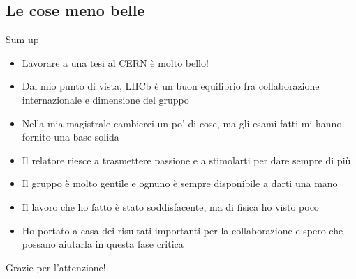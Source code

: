 \documentclass[
10pt,
aspectratio=169,
]{beamer}
\begin{document}
\subsection{Le cose meno belle}


\begin{frame}{Sum up}
\begin{itemize}
    \item Lavorare a una tesi al CERN è molto bello!
    \item Dal mio punto di vista, LHCb è un buon equilibrio fra collaborazione internazionale e dimensione del gruppo
    \item Nella mia magistrale cambierei un po' di cose, ma gli esami fatti mi hanno fornito una base solida
    \item Il relatore riesce a trasmettere passione e a stimolarti per dare sempre di più
    \item Il gruppo è molto gentile e ognuno è sempre disponibile a darti una mano
    \item Il lavoro che ho fatto è stato soddisfacente, ma di fisica ho visto poco
    \item Ho portato a casa dei risultati importanti per la collaborazione e spero che possano aiutarla in questa fase critica
\end{itemize}
    
\end{frame}

\begin{frame}[plain]
	\vfill
	\centering
	{
		\centering \Huge \color{white} Grazie per l'attenzione!%
	}
	\vfill
\end{frame}
\end{document}
